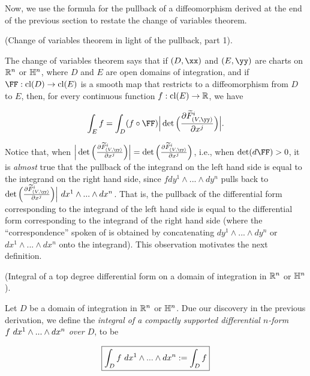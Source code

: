 Now, we use the formula for the pullback of a diffeomorphism derived at the end of the previous section to restate the change of variables theorem.

\begin{deriv}
\label{ch::diff_forms::deriv::change_of_vars_in_light_of_pullback}

     (Change of variables theorem in light of the pullback, part 1).
  
    The change of variables theorem says that if $(D, \xx)$ and $(E, \yy)$ are charts on $\mathbb{R}^n$ or $\mathbb{H}^n$, where $D$ and $E$ are open domains of integration, and if $\FF:\cl(D) \rightarrow \cl(E)$ is a smooth map that restricts to a diffeomorphism from $D$ to $E$, then, for every continuous function $f:\text{cl}(E) \rightarrow \mathbb{R}$, we have
    
    \begin{align*}
        \int_E f = \int_D (f \circ \FF) \Big| \det\Big(\frac{\pd \tF_{(V, \yy)}^i}{\pd x^j} \Big) \Big|.
    \end{align*}

    Notice that, when $\Big| \det\Big(\frac{\pd \tF_{(V, \yy)}^i}{\pd x^j} \Big) \Big| = \det\Big(\frac{\pd \tF_{(V, \yy)}^i}{\pd x^j} \Big)$, i.e., when $\det(d\FF) > 0$, it is \textit{almost} true that the pullback of the integrand on the left hand side is equal to the integrand on the right hand side, since $f dy^1 \wedge ... \wedge dy^n$ pulls back to $\det\Big(\frac{\pd \tF_{(V, \yy)}^i}{\pd x^j} \Big) \Big| \spc dx^1 \wedge ... \wedge dx^n$. That is, the pullback of the differential form corresponding to the integrand of the left hand side is equal to the differential form corresponding to the integrand of the right hand side (where the ``correspondence'' spoken of is obtained by concatenating $dy^1 \wedge ... \wedge dy^n$ or $dx^1 \wedge ... \wedge dx^n$ onto the integrand). This observation motivates the next definition.
\end{deriv}

\begin{defn}
\label{ch::diff_forms::defn::integral_over_domain_of_integration_Rn_Hn}
     (Integral of a top degree differential form on a domain of integration in $\mathbb{R}^n$ or $\mathbb{H}^n$).
    
    Let $D$ be a domain of integration in $\mathbb{R}^n$ or $\mathbb{H}^n$. Due our discovery in the previous derivation, we define the \textit{integral of a compactly supported differential $n$-form $f \text{ } dx^1 \wedge ... \wedge dx^n$ over $D$}, to be
    
    \begin{align*}
        \boxed
        {
            \int_D f \text{ } dx^1 \wedge ... \wedge dx^n := \int_D f
        }
    \end{align*}
\end{defn}

